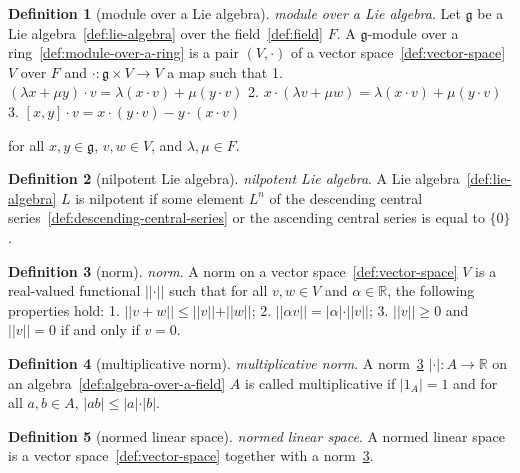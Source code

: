 \documentclass[12pt,a4paper]{article}
\theoremstyle{definition}
\newtheorem{definition}{Definition}
\begin{document}
\begin{definition}[module over a Lie algebra]\label{def:module-over-a-lie-algebra}
\emph{module over a Lie algebra}. Let $\mathfrak g$ be a Lie algebra~\ref{def:lie-algebra} over the field~\ref{def:field} $F$. A $\mathfrak g$-module over a ring~\ref{def:module-over-a-ring} is a pair $(V,\cdot)$ of a vector space~\ref{def:vector-space} $V$ over $F$ and $\cdot:\mathfrak g \times V \to V$ a map such that
1. $(\lambda x + \mu y)\cdot v = \lambda (x\cdot v) + \mu(y\cdot v)$
2. $x\cdot (\lambda v + \mu w) = \lambda (x\cdot v) + \mu(y\cdot v)$
3. $[x,y]\cdot v = x\cdot (y\cdot v) - y\cdot (x\cdot v)$

for all $x,y \in \mathfrak g$, $v,w\in V$, and $\lambda,\mu \in F$.
\end{definition}

\begin{definition}[nilpotent Lie algebra]\label{def:nilpotent-lie-algebra}
\emph{nilpotent Lie algebra}. A Lie algebra~\ref{def:lie-algebra} $L$ is nilpotent if some element $L^n$ of the descending central series~\ref{def:descending-central-series} or the ascending central series is equal to $\{0\}$.
\end{definition}

\begin{definition}[norm]\label{def:norm}
\emph{norm}. A norm on a vector space~\ref{def:vector-space} $V$ is a real-valued functional $\vert \vert \cdot\vert \vert $ such that for all $v,w \in V$ and $\alpha \in \mathbb R$, the following properties hold:
1. $\vert \vert v+w\vert \vert  \leq \vert \vert v\vert \vert  + \vert \vert w\vert \vert $;
2. $\vert \vert \alpha v\vert \vert  = \vert \alpha\vert  \cdot \vert \vert v\vert \vert $;
3. $\vert \vert v\vert \vert  \geq 0$ and $\vert \vert v\vert \vert  = 0$ if and only if $v=0$.
\end{definition}

\begin{definition}[multiplicative norm]\label{def:multiplicative-norm}
\emph{multiplicative norm}. A norm~\ref{def:norm} $\vert \cdot \vert  : A\to \mathbb R$ on an algebra~\ref{def:algebra-over-a-field} $A$ is called multiplicative if $\vert 1_A\vert  = 1$ and for all $a,b\in A$,  $\vert ab\vert  \leq \vert a\vert \cdot \vert b\vert $.
\end{definition}

\begin{definition}[normed linear space]\label{def:normed-linear-space}
\emph{normed linear space}. A normed linear space is a vector space~\ref{def:vector-space} together with a norm~\ref{def:norm}.
\end{definition}
\end{document}

